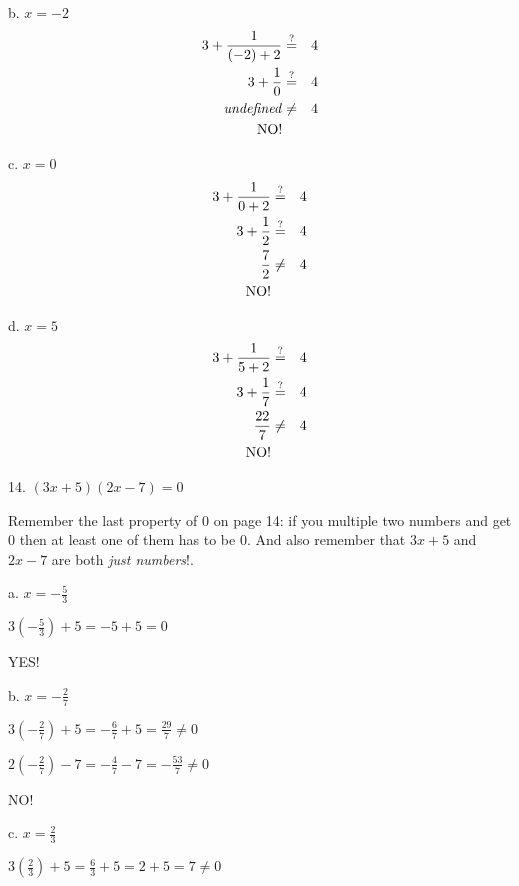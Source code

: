 \documentclass[letterpaper]{article}
\begin{document}
b. $x=-2$
\begin{eqnarray*}
3+\frac{1}{(-2)+2} &\stackrel{?}{=}& 4 \\
3+\frac{1}{0} &\stackrel{?}{=}& 4 \\
\mbox{\emph{undefined}} &\ne& 4 \\
\mbox{NO!} \\
\end{eqnarray*}

c. $x=0$
\begin{eqnarray*}
3+\frac{1}{0+2} &\stackrel{?}{=}& 4 \\
3+\frac{1}{2} &\stackrel{?}{=}& 4 \\
\frac{7}{2} &\ne& 4 \\
\mbox{NO!} \\
\end{eqnarray*}

d. $x=5$
\begin{eqnarray*}
3+\frac{1}{5+2} &\stackrel{?}{=}& 4 \\
3+\frac{1}{7} &\stackrel{?}{=}& 4 \\
\frac{22}{7} &\ne& 4 \\
\mbox{NO!} \\
\end{eqnarray*}

\bigskip

14. $(3x+5)(2x-7)=0$

\bigskip

Remember the last property of 0 on page 14: if you multiple two numbers and get
0 then at least one of them has to be 0.  And also remember that $3x+5$ and
$2x-7$ are both \emph{just numbers}!.

\bigskip

a. $x = -\frac{5}{3}$

\bigskip

$3(-\frac{5}{3}) + 5 = -5 + 5 = 0$

YES!

\bigskip

b. $x = -\frac{2}{7}$

\bigskip

$3(-\frac{2}{7}) + 5 = -\frac{6}{7} + 5 = \frac{29}{7} \ne 0$

$2(-\frac{2}{7}) - 7 = -\frac{4}{7} - 7 = -\frac{53}{7} \ne 0$

NO!

\bigskip

c. $x = \frac{2}{3}$

\bigskip

$3(\frac{2}{3}) + 5 = \frac{6}{3} + 5 = 2 + 5 = 7 \ne 0$
\end{document}
